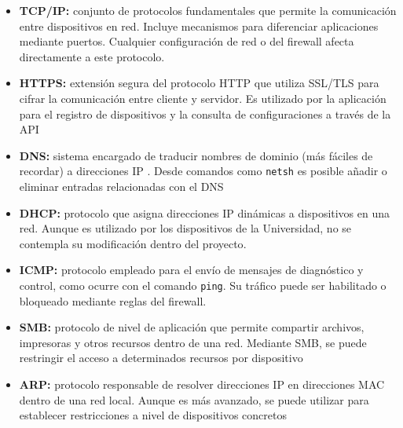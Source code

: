 \begin{itemize}
	\item \textbf{TCP/IP:} conjunto de protocolos fundamentales que permite la comunicación entre dispositivos en red.
	Incluye mecanismos para diferenciar aplicaciones mediante puertos.
	Cualquier configuración de red o del firewall afecta directamente a este protocolo. \cite{wikipediaTCP}

	\item \textbf{HTTPS:} extensión segura del protocolo HTTP que utiliza SSL/TLS para cifrar la comunicación entre
	cliente y servidor.
	Es utilizado por la aplicación para el registro de dispositivos y la consulta de configuraciones a través de la API\cite{wikipediaHTTPS}

	\item \textbf{DNS:} sistema encargado de traducir nombres de dominio (más fáciles de recordar) a direcciones IP .
	Desde comandos como \texttt{netsh} es posible añadir o eliminar entradas relacionadas con el DNS\cite{wikipediaDNS}

	\item \textbf{DHCP:} protocolo que asigna direcciones IP dinámicas a dispositivos en una red.
	Aunque es utilizado por los dispositivos de la Universidad, no se contempla su modificación dentro del proyecto\cite{microsoftDHCP}.

	\item \textbf{ICMP:} protocolo empleado para el envío de mensajes de diagnóstico y control, como ocurre con el
	comando \texttt{ping}.
	Su tráfico puede ser habilitado o bloqueado mediante reglas del firewall\cite{wikipediaICMP}.

	\item \textbf{SMB:} protocolo de nivel de aplicación que permite compartir archivos, impresoras y otros recursos
	dentro de una red.
	Mediante SMB, se puede restringir el acceso a determinados recursos por dispositivo\cite{techtargetSMB}

	\item \textbf{ARP:} protocolo responsable de resolver direcciones IP en direcciones MAC dentro de una red local.
	Aunque es más avanzado, se puede utilizar para establecer restricciones a nivel de dispositivos concretos\cite{wikipediaARP}
\end{itemize}